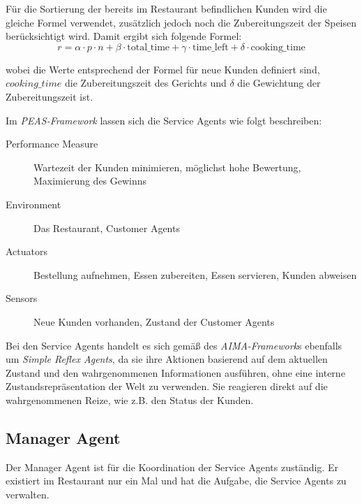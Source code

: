 Für die Sortierung der bereits im Restaurant befindlichen Kunden wird die gleiche Formel verwendet, zusätzlich jedoch noch die Zubereitungszeit der Speisen berücksichtigt wird. Damit ergibt sich folgende Formel:
\begin{equation*}
    r = \alpha \cdot p \cdot n + \beta \cdot \text{total\_time} + \gamma \cdot \text{time\_left} + \delta \cdot \text{cooking\_time}
\end{equation*}

wobei die Werte entsprechend der Formel für neue Kunden definiert sind, $cooking\_time$ die Zubereitungszeit des Gerichts und $\delta$ die Gewichtung der Zubereitungszeit ist.

Im \emph{PEAS-Framework} lassen sich die Service Agents wie folgt beschreiben:
\begin{description}
    \item[Performance Measure] Wartezeit der Kunden minimieren, möglichst hohe Bewertung, Maximierung des Gewinns
    \item[Environment] Das Restaurant, Customer Agents
    \item[Actuators] Bestellung aufnehmen, Essen zubereiten, Essen servieren, Kunden abweisen
    \item[Sensors] Neue Kunden vorhanden, Zustand der Customer Agents
\end{description}

Bei den Service Agents handelt es sich gemäß des \emph{AIMA-Framework}s ebenfalls um \emph{Simple Reflex Agents}, da sie ihre Aktionen basierend auf dem aktuellen Zustand und den wahrgenommenen Informationen ausführen, ohne eine interne Zustandsrepräsentation der Welt zu verwenden. Sie reagieren direkt auf die wahrgenommenen Reize, wie z.B. den Status der Kunden.


\subsection{Manager Agent}
\label{subsec:manager_agent}
Der Manager Agent ist für die Koordination der Service Agents zuständig. Er existiert im Restaurant nur ein Mal und hat die Aufgabe, die Service Agents zu verwalten.